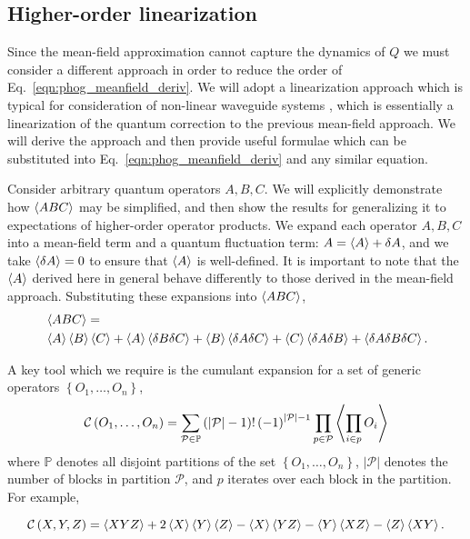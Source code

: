 \subsection{Higher-order linearization}\label{sec:linearization}
Since the mean-field approximation cannot capture the dynamics of $Q$ we must consider a different approach in order to reduce the order of Eq.~\ref{eqn:phog_meanfield_deriv}. We will adopt a linearization approach which is typical for consideration of non-linear waveguide systems \cite{Doerr1994, Haus1990,Ju2012}, which is essentially a linearization of the quantum correction to the previous mean-field approach. We will derive the approach and then provide useful formulae which can be substituted into Eq.~\ref{eqn:phog_meanfield_deriv} and any similar equation. 

Consider arbitrary quantum operators $A, B, C$. We will explicitly demonstrate how $\ev{ABC}$ may be simplified, and then show the results for generalizing it to expectations of higher-order operator products. We expand each operator $A, B, C$ into a mean-field term and a quantum fluctuation term: $A = \ev{A} + \delta A$, and we take $\ev{\delta A} = 0$ to ensure that $\ev{A}$ is well-defined. It is important to note that the $\ev{A}$ derived here in general behave differently to those derived in the mean-field approach. Substituting these expansions into $\ev{A B C}$,
\begin{align}\label{eqn:phog_linearization_deriv}
&\ev{A B C} = \notag \\
%
&\ev{A}\ev{B}\ev{C} + \ev{A}\ev{\delta B \delta C} + \ev{B} \ev{\delta A \delta C} + \ev{C} \ev{\delta A \delta B} + \ev{\delta A \delta B \delta C}.
\end{align}

\noindent A key tool which we require is the cumulant expansion for a set of generic operators $\left\{ O_1, \dots, O_n\right\}$, 
\begin{equation}
\mathcal{C}\left(O_1, \dots, O_n\right) = \sum_{\mathcal{P}\in \mathbb{P}} \left(\left|\mathcal{P}\right| - 1\right)! \left(-1\right)^{\left|\mathcal{P}\right|-1} \prod_{p \in \mathcal{P}} \ev{\prod_{i \in p} O_i}
\end{equation}
where $\mathbb{P}$ denotes all disjoint partitions of the set $\left\{O_1, \dots, O_n\right\}$, $\left| \mathcal{P}\right|$ denotes the number of blocks in partition $\mathcal{P}$, and $p$ iterates over each block in the partition. For example,

\begin{equation}
\mathcal{C} \left(X, Y, Z\right) = \ev{X Y Z} + 2 \ev{X}\ev{Y}\ev{Z} - \ev{X}\ev{Y Z} - \ev{Y}\ev{X Z} - \ev{Z}\ev{X Y}.
\end{equation}

